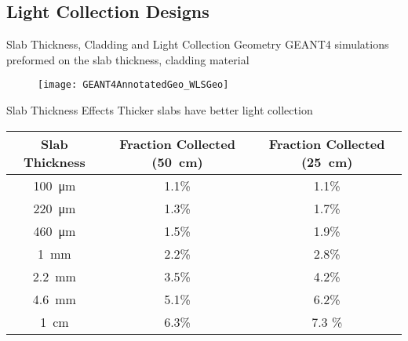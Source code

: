 \subsection{Light Collection Designs}
\begin{frame}{Slab Thickness, Cladding and Light Collection Geometry}
GEANT4 simulations preformed on the slab thickness, cladding material
  \begin{figure}
    \centering
    \texttt{[image: GEANT4AnnotatedGeo\_WLSGeo]}
  \end{figure}
\hyperlink{G4Intro}{}
\end{frame}
\begin{frame}{Slab Thickness Effects}
Thicker slabs have better light collection
\begin{table}
	\small
  \begin{tabular}{c | c  c}
	\toprule
	Slab Thickness & Fraction Collected (\SI{50}{\cm}) & Fraction Collected (\SI{25}{\cm}) \\
	\midrule
	\SI{100}{\um} & 1.1\% & 1.1\% \\
	\SI{220}{\um} & 1.3\% & 1.7\% \\
	\SI{460}{\um} & 1.5\% & 1.9\% \\
	\SI{1}{\mm} & 2.2\% & 2.8\% \\
	\SI{2.2}{\mm} & 3.5\% & 4.2\% \\
	\SI{4.6}{\mm} & 5.1\% & 6.2\% \\
	\SI{1}{\cm} & 6.3\% & 7.3 \% \\
	\bottomrule
	\end{tabular}
\end{table}
\end{frame}
